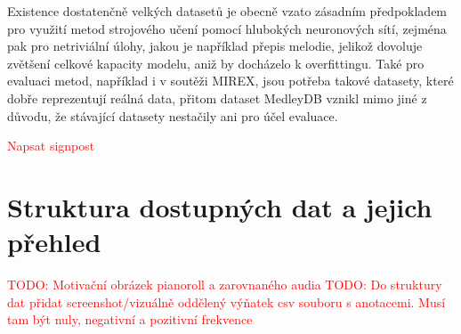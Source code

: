 Existence dostatenčně velkých datasetů je obecně vzato zásadním předpokladem pro využití metod strojového učení pomocí hlubokých neuronových sítí, zejména pak pro netriviální úlohy, jakou je například přepis melodie, jelikož dovoluje zvětšení celkové kapacity modelu, aniž by docházelo k overfittingu. Také pro evaluaci metod, například i v soutěži MIREX, jsou potřeba takové datasety, které dobře reprezentují reálná data, přitom dataset MedleyDB vznikl mimo jiné z důvodu, že stávající datasety nestačily ani pro účel evaluace. 

\textcolor{red}{Napsat signpost}



\section{Struktura dostupných dat a jejich přehled}

\textcolor{red}{TODO: Motivační obrázek pianoroll a zarovnaného audia}
\textcolor{red}{TODO: Do struktury dat přidat screenshot/vizuálně oddělený výňatek csv souboru s anotacemi. Musí tam být nuly, negativní a pozitivní frekvence}

